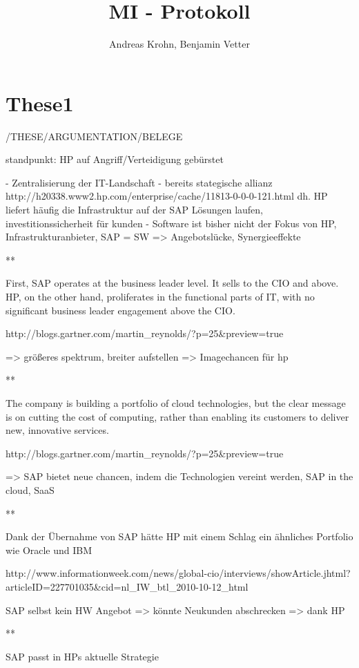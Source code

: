 \documentclass[a4paper,10pt]{article}
\title{MI - Protokoll}
\author{Andreas Krohn, Benjamin Vetter}
\begin{document}
\maketitle

\section{These1}

/THESE/ARGUMENTATION/BELEGE

standpunkt: HP auf Angriff/Verteidigung gebürstet

- Zentralisierung der IT-Landschaft
- bereits stategische allianz http://h20338.www2.hp.com/enterprise/cache/11813-0-0-0-121.html dh. HP liefert häufig die Infrastruktur auf der SAP Lösungen laufen, investitionssicherheit für kunden
- Software ist bisher nicht der Fokus von HP, Infrastrukturanbieter, SAP = SW => Angebotslücke, Synergieeffekte

**

First, SAP operates at the business leader level. It sells to the CIO and above. HP, on the other hand, proliferates in the functional parts of IT, with no significant business leader engagement above the CIO.

http://blogs.gartner.com/martin_reynolds/?p=25&preview=true

=> größeres spektrum, breiter aufstellen 
=> Imagechancen für hp

**

The company is building a portfolio of cloud technologies, but the clear message is on cutting the cost of computing, rather than enabling its customers to deliver new, innovative services.

http://blogs.gartner.com/martin_reynolds/?p=25&preview=true

=> SAP bietet neue chancen, indem die Technologien vereint werden, SAP in the cloud, SaaS

**

Dank der Übernahme von SAP hätte HP mit einem Schlag ein ähnliches Portfolio wie Oracle und IBM

http://www.informationweek.com/news/global-cio/interviews/showArticle.jhtml?articleID=227701035&cid=nl_IW_btl_2010-10-12_html

SAP selbst kein HW Angebot => könnte Neukunden abschrecken => dank HP 

**

SAP passt in HPs aktuelle Strategie
\end{document}
